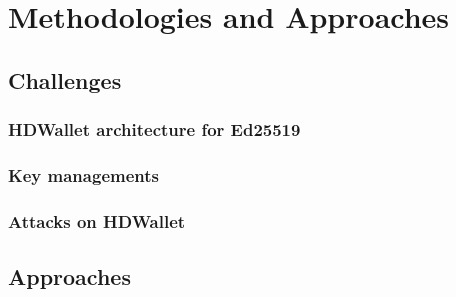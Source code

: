 \chapter{Methodologies and Approaches} \label{chap:Methodologies_and_Approaches}

\section{Challenges}

\subsection{HDWallet architecture for Ed25519}

\subsection{Key managements}

\subsection{Attacks on HDWallet}

\section{Approaches}



